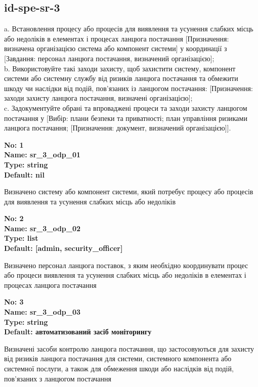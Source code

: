 \documentclass{article}
\begin{document}
\subsection{id-spe-sr-3}
a. Встановлення процесу або процесів для виявлення та усунення слабких місць або недоліків в елементах і процесах ланцюга постачання [Призначення: визначена організацією система або компонент системи] у координації з [Завдання: персонал ланцюга постачання, визначений організацією];\\ 
b. Використовуйте такі заходи захисту, щоб захистити систему, компонент системи або системну службу від ризиків ланцюга постачання та обмежити шкоду чи наслідки від подій, пов'язаних із ланцюгом постачання: [Призначення: заходи захисту ланцюга постачання, визначені організацією];\\ 
c. Задокументуйте обрані та впроваджені процеси та заходи захисту ланцюгом постачання у [Вибір: плани безпеки та приватності; план управління ризиками ланцюга постачання; [Призначення: документ, визначений організацією]].

\vspace{10pt}
{\footnotesize\bfseries
No: 1\\
Name: sr\_\allowbreak{}3\_\allowbreak{}odp\_\allowbreak{}01\\
Type: string\\
Default: nil
}

{\footnotesize Визначено систему або компонент системи, який потребує процесу або процесів для виявлення та усунення слабких місць або недоліків}


{\footnotesize\bfseries
No: 2\\
Name: sr\_\allowbreak{}3\_\allowbreak{}odp\_\allowbreak{}02\\
Type: list\\
Default: [\textquotedbl{}admin\textquotedbl{}, \textquotedbl{}security\_\allowbreak{}officer\textquotedbl{}]
}

{\footnotesize Визначено персонал ланцюга поставок, з яким необхідно координувати процес або процеси виявлення та усунення слабких місць або недоліків в елементах і процесах ланцюга постачання}


{\footnotesize\bfseries
No: 3\\
Name: sr\_\allowbreak{}3\_\allowbreak{}odp\_\allowbreak{}03\\
Type: string\\
Default: \textquotedbl{}автоматизований засіб моніторингу\textquotedbl{}
}

{\footnotesize Визначені засоби контролю ланцюга постачання, що застосовуються для захисту від ризиків ланцюга постачання для системи, системного компонента або системної послуги, а також для обмеження шкоди або наслідків від подій, пов'язаних з ланцюгом постачання}
\end{document}
